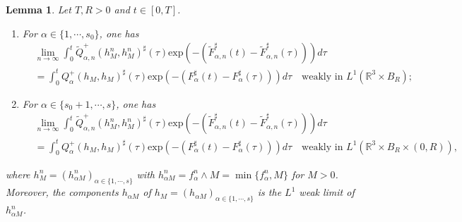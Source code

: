 \documentclass[reqno,11pt]{amsart}
\newtheorem{lemma}{Lemma}[section]
\numberwithin{equation}{section}
\def\R{\mathbb{R}}
\def\exp{\mathrm{exp}}
\begin{document}
\begin{lemma}\label{Lemma 7.2}
	Let $T,R>0$ and $t\in [0,T]$.
	\begin{enumerate}
		\item {For $\alpha \in \{1,\cdots,s_0\}$, one has
	\begin{equation}\label{eq7.90}
		\begin{aligned}
			& \lim \limits_{n\rightarrow \infty} \int_{0}^{t}\tilde{Q}^+_{\alpha ,n} (h^n_{M} ,h^n_{M})^\sharp (\tau) \exp(-(\tilde{F}^\sharp _{\alpha ,n} (t)-\tilde{F}^\sharp _{\alpha ,n} (\tau))) d \tau \\
			&= \int_{0}^{t}Q^+_{\alpha } (h_{M} ,h_{M})^\sharp (\tau) \exp(-(F^\sharp _{\alpha } (t)-F^\sharp _{\alpha} (\tau))) d \tau \quad \text{weakly in } L^1 (\R^3 \times B_R);
		\end{aligned}
	\end{equation}}
	\item {For $\alpha \in \{s_0+1,\cdots,s\}$, one has
	\begin{equation}\label{eq7.91}
		\begin{aligned}
			& \lim \limits_{n\rightarrow \infty} \int_{0}^{t}\tilde{Q}^+_{\alpha ,n} (h^n_{M} ,h^n_{M})^\sharp (\tau) \exp(-(\tilde{F}^\sharp _{\alpha ,n} (t)-\tilde{F}^\sharp _{\alpha ,n} (\tau))) d \tau \\
			&= \int_{0}^{t}Q^+_{\alpha } (h_{M} ,h_{M})^\sharp (\tau) \exp(-(F^\sharp _{\alpha } (t)-F^\sharp _{\alpha} (\tau))) d \tau \quad \text{weakly in } L^1 (\R^3 \times B_R \times (0,R)),
		\end{aligned}
	\end{equation}}
\end{enumerate}
	where $h^n_{M} = ( h^n_{\alpha M} )_{ \alpha \in \{ 1, \cdots, s \} }$ with $h^n_{\alpha M} = f^n_\alpha \wedge M = \min \{ f^n_\alpha, M \}$ for $M>0$. Moreover, the components $h_{\alpha M}$ of $h_M = ( h_{\alpha M} )_{ \alpha \in \{ 1, \cdots, s \} }$ is the $L^1$ weak limit of $h^n_{\alpha M}$.
\end{lemma}
\end{document}
